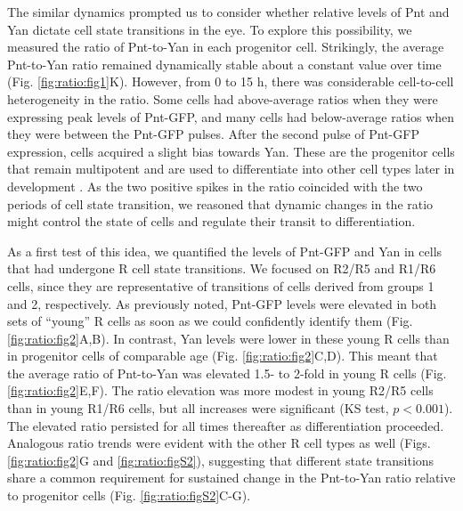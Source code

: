 The similar dynamics prompted us to consider whether relative levels of Pnt and Yan dictate cell state transitions in the eye. To explore this possibility, we measured the ratio of Pnt-to-Yan in each progenitor cell. Strikingly, the average Pnt-to-Yan ratio remained dynamically stable about a constant value over time (Fig. \ref{fig:ratio:fig1}K). However, from 0 to 15 h, there was considerable cell-to-cell heterogeneity in the ratio. Some cells had above-average ratios when they were expressing peak levels of Pnt-GFP, and many cells had below-average ratios when they were between the Pnt-GFP pulses. After the second pulse of Pnt-GFP expression, cells acquired a slight bias towards Yan. These are the progenitor cells that remain multipotent and are used to differentiate into other cell types later in development \cite{Wolff1991}. As the two positive spikes in the ratio coincided with the two periods of cell state transition, we reasoned that dynamic changes in the ratio might control the state of cells and regulate their transit to differentiation.

As a first test of this idea, we quantified the levels of Pnt-GFP and Yan in cells that had undergone R cell state transitions. We focused on R2/R5 and R1/R6 cells, since they are representative of transitions of cells derived from groups 1 and 2, respectively. As previously noted, Pnt-GFP levels were elevated in both sets of ``young'' R cells as soon as we could confidently identify them (Fig. \ref{fig:ratio:fig2}A,B). In contrast, Yan levels were lower in these young R cells than in progenitor cells of comparable age (Fig. \ref{fig:ratio:fig2}C,D). This meant that the average ratio of Pnt-to-Yan was elevated 1.5- to 2-fold in young R cells (Fig. \ref{fig:ratio:fig2}E,F). The ratio elevation was more modest in young R2/R5 cells than in young R1/R6 cells, but all increases were significant (KS test, $p<0.001$). The elevated ratio persisted for all times thereafter as differentiation proceeded. Analogous ratio trends were evident with the other R cell types as well (Figs. \ref{fig:ratio:fig2}G and \ref{fig:ratio:figS2}), suggesting that different state transitions share a common requirement for sustained change in the Pnt-to-Yan ratio relative to progenitor cells (Fig. \ref{fig:ratio:figS2}C-G).

